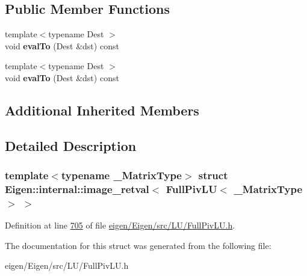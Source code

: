 \subsection*{Public Member Functions}
\begin{DoxyCompactItemize}
\item 
\mbox{\label{struct_eigen_1_1internal_1_1image__retval_3_01_full_piv_l_u_3_01___matrix_type_01_4_01_4_aa8a17ec738e106df5aca51488967f525}} 
{\footnotesize template$<$typename Dest $>$ }\\void {\bfseries eval\+To} (Dest \&dst) const
\item 
\mbox{\label{struct_eigen_1_1internal_1_1image__retval_3_01_full_piv_l_u_3_01___matrix_type_01_4_01_4_aa8a17ec738e106df5aca51488967f525}} 
{\footnotesize template$<$typename Dest $>$ }\\void {\bfseries eval\+To} (Dest \&dst) const
\end{DoxyCompactItemize}
\subsection*{Additional Inherited Members}


\subsection{Detailed Description}
\subsubsection*{template$<$typename \+\_\+\+Matrix\+Type$>$\newline
struct Eigen\+::internal\+::image\+\_\+retval$<$ Full\+Piv\+L\+U$<$ \+\_\+\+Matrix\+Type $>$ $>$}



Definition at line \hyperlink{eigen_2_eigen_2src_2_l_u_2_full_piv_l_u_8h_source_l00705}{705} of file \hyperlink{eigen_2_eigen_2src_2_l_u_2_full_piv_l_u_8h_source}{eigen/\+Eigen/src/\+L\+U/\+Full\+Piv\+L\+U.\+h}.



The documentation for this struct was generated from the following file\+:\begin{DoxyCompactItemize}
\item 
eigen/\+Eigen/src/\+L\+U/\+Full\+Piv\+L\+U.\+h\end{DoxyCompactItemize}
